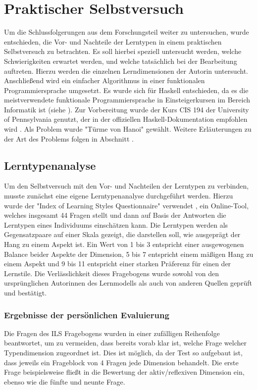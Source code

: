 \clearpage
\section{Praktischer Selbstversuch}
\label{sec:practice}

Um die Schlussfolgerungen aus dem Forschungsteil weiter zu untersuchen, wurde entschieden, die Vor- und Nachteile der Lerntypen in einem praktischen Selbstversuch zu betrachten.
Es soll hierbei speziell untersucht werden, welche Schwierigkeiten erwartet werden, und welche tatsächlich bei der Bearbeitung auftreten.
Hierzu werden die einzelnen Lerndimensionen der Autorin untersucht. Anschließend wird ein einfacher Algorithmus in einer funktionalen Programmiersprache umgesetzt. Es wurde sich für Haskell entschieden, da es die meistverwendete funktionale Programmiersprache in Einsteigerkursen im Bereich Informatik ist (siehe ).
Zur Vorbereitung wurde der Kurs CIS 194 \cite{cis194} der University of Pennsylvania genutzt, der in der offiziellen Haskell-Dokumentation empfohlen wird \cite{haskelldoc}.
Als Problem wurde "Türme von Hanoi" gewählt. Weitere Erläuterungen zu der Art des Problems folgen in Abschnitt .

\subsection{Lerntypenanalyse}
Um den Selbstversuch mit den Vor- und Nachteilen der Lerntypen zu verbinden, musste zunächst eine eigene Lerntypenanalyse durchgeführt werden.
Hierzu wurde der "Index of Learning Styles Questionnaire" verwendet \cite{ils_questionnaire}, ein Online-Tool, welches insgesamt 44 Fragen stellt und dann auf Basis der Antworten die Lerntypen eines Individuums einschätzen kann. Die Lerntypen werden als Gegensatzpaare auf einer Skala gezeigt, die darstellen soll, wie ausgeprägt der Hang zu einem Aspekt ist. Ein Wert von 1 bis 3 entspricht einer ausgewogenen Balance beider Aspekte der Dimension, 5 bis 7 entspricht einem mäßigen Hang zu einem Aspekt und 9 bis 11 entspricht einer starken Präferenz für einen der Lernstile.
Die Verlässlichkeit dieses Fragebogens wurde sowohl von den ursprünglichen Autorinnen des Lernmodells \cite{felder2005} als auch von anderen Quellen \cite{zywno} geprüft und bestätigt.

\subsubsection{Ergebnisse der persönlichen Evaluierung}
Die Fragen des ILS Fragebogens wurden in einer zufälligen Reihenfolge beantwortet, um zu vermeiden, dass bereits vorab klar ist, welche Frage welcher Typendimension zugeordnet ist. Dies ist möglich, da der Test so aufgebaut ist, dass jeweils ein Frageblock von 4 Fragen jede Dimension behandelt. Die erste Frage beispielsweise fließt in die Bewertung der aktiv/reflexiven Dimension ein, ebenso wie die fünfte und neunte Frage.

